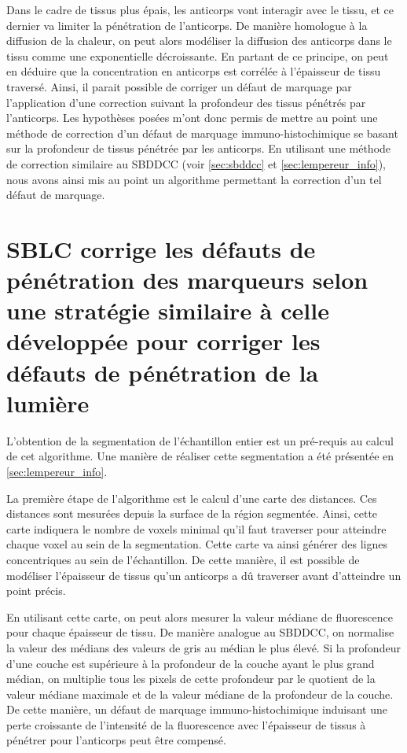 \documentclass[\main/main.tex]{subfiles}
\begin{document}
%
Dans le cadre de tissus plus épais, les anticorps vont interagir avec le tissu, et ce dernier va limiter la pénétration de l'anticorps.
%
De manière homologue à la diffusion de la chaleur, on peut alors modéliser la diffusion des anticorps dans le tissu comme une exponentielle décroissante.
%
En partant de ce principe, on peut en déduire que la concentration en anticorps est corrélée à l'épaisseur de tissu traversé.
%
Ainsi, il parait possible de corriger un défaut de marquage par l'application d'une correction suivant la profondeur des tissus pénétrés par l'anticorps.
%
Les hypothèses posées m'ont donc permis de mettre au point une méthode de correction d'un défaut de marquage immuno-histochimique se basant sur la profondeur de tissus pénétrée par les anticorps.
%
En utilisant une méthode de correction similaire au SBDDCC (voir \autoref{sec:sbddcc} et \autoref{sec:lempereur_info}), nous avons ainsi mis au point un algorithme permettant la correction d'un tel défaut de marquage.
    
    \section{SBLC corrige les défauts de pénétration des marqueurs selon une stratégie similaire à celle développée pour corriger les défauts de pénétration de la lumière}
 
%
L'obtention de la segmentation de l'échantillon entier est un pré-requis au calcul de cet algorithme.
%
Une manière de réaliser cette segmentation a été présentée en \autoref{sec:lempereur_info}.

%
La première étape de l'algorithme est le calcul
d'une carte des distances.
%
Ces distances sont mesurées depuis la surface de la région segmentée.
%
Ainsi, cette carte indiquera le nombre de voxels minimal qu'il faut
traverser pour atteindre chaque voxel au sein de la segmentation.
%
Cette carte va ainsi générer des lignes concentriques au sein de l'échantillon.
%
De cette manière, il est possible de modéliser l'épaisseur de tissus qu'un anticorps a dû traverser avant d'atteindre un point précis.
%

%
En utilisant cette carte, on peut alors mesurer la valeur médiane de fluorescence pour chaque épaisseur de tissu.
%
De manière analogue au SBDDCC, on normalise la valeur des médians des valeurs de gris au médian le plus élevé. Si la profondeur d'une couche est supérieure à la profondeur de la couche ayant le plus grand médian, on multiplie tous les pixels de cette profondeur par le quotient de la valeur médiane maximale et de la valeur médiane de la profondeur de la couche.
%
De cette manière, un défaut de marquage immuno-histochimique 
induisant une perte croissante de l'intensité de la fluorescence avec
l'épaisseur de tissus à pénétrer pour l'anticorps peut être
compensé.
\end{document}
